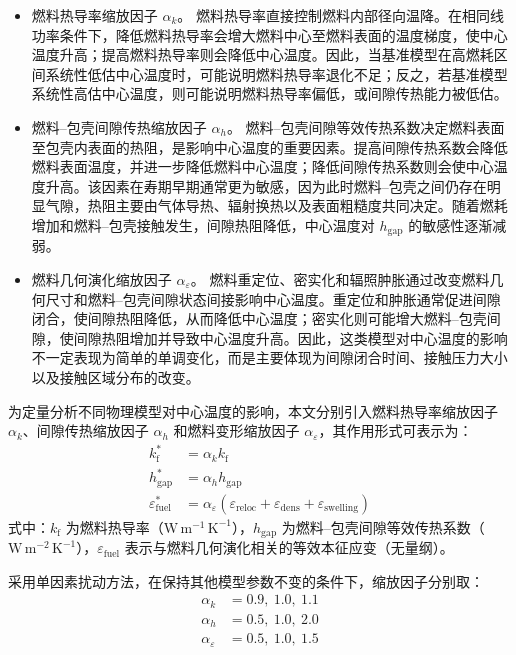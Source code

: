 \begin{itemize}
	\item 燃料热导率缩放因子 \(\alpha_k\)。
	燃料热导率直接控制燃料内部径向温降。在相同线功率条件下，降低燃料热导率会增大燃料中心至燃料表面的温度梯度，使中心温度升高；提高燃料热导率则会降低中心温度。因此，当基准模型在高燃耗区间系统性低估中心温度时，可能说明燃料热导率退化不足；反之，若基准模型系统性高估中心温度，则可能说明燃料热导率偏低，或间隙传热能力被低估。
	
	\item 燃料--包壳间隙传热缩放因子 \(\alpha_h\)。
	燃料--包壳间隙等效传热系数决定燃料表面至包壳内表面的热阻，是影响中心温度的重要因素。提高间隙传热系数会降低燃料表面温度，并进一步降低燃料中心温度；降低间隙传热系数则会使中心温度升高。该因素在寿期早期通常更为敏感，因为此时燃料--包壳之间仍存在明显气隙，热阻主要由气体导热、辐射换热以及表面粗糙度共同决定。随着燃耗增加和燃料--包壳接触发生，间隙热阻降低，中心温度对 \(h_\mathrm{gap}\) 的敏感性逐渐减弱。
	
	\item 燃料几何演化缩放因子 \(\alpha_\varepsilon\)。
	燃料重定位、密实化和辐照肿胀通过改变燃料几何尺寸和燃料--包壳间隙状态间接影响中心温度。重定位和肿胀通常促进间隙闭合，使间隙热阻降低，从而降低中心温度；密实化则可能增大燃料--包壳间隙，使间隙热阻增加并导致中心温度升高。因此，这类模型对中心温度的影响不一定表现为简单的单调变化，而是主要体现为间隙闭合时间、接触压力大小以及接触区域分布的改变。
\end{itemize}

为定量分析不同物理模型对中心温度的影响，本文分别引入燃料热导率缩放因子 \(\alpha_k\)、间隙传热缩放因子 \(\alpha_h\) 和燃料变形缩放因子 \(\alpha_\varepsilon\)，其作用形式可表示为：
\begin{align}
	k_{\mathrm f}^\ast &= \alpha_k k_{\mathrm f} \nonumber \\
	h_\mathrm{gap}^\ast &= \alpha_h h_\mathrm{gap} \nonumber \\
	\varepsilon^\ast_\mathrm{fuel}
	&=
	\alpha_\varepsilon
	\left(
	\varepsilon_\mathrm{reloc}
	+
	\varepsilon_\mathrm{dens}
	+
	\varepsilon_\mathrm{swelling}
	\right) \label{eq:fuel_params}
\end{align}
\noindent 式中：\(k_{\mathrm f}\) 为燃料热导率（$\mathrm{W\,m^{-1}\,K^{-1}}$），\(h_\mathrm{gap}\) 为燃料--包壳间隙等效传热系数（$\mathrm{W\,m^{-2}\,K^{-1}}$），\(\varepsilon_\mathrm{fuel}\) 表示与燃料几何演化相关的等效本征应变（无量纲）。

采用单因素扰动方法，在保持其他模型参数不变的条件下，缩放因子分别取：
\begin{align}
	\alpha_k &= 0.9,\ 1.0,\ 1.1 \nonumber \\
	\alpha_h &= 0.5,\ 1.0,\ 2.0 \nonumber \\
	\alpha_\varepsilon &= 0.5,\ 1.0,\ 1.5 \label{eq:alpha_params}
\end{align}

